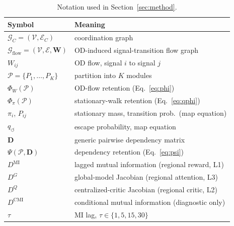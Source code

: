 \documentclass[journal]{IEEEtran}
\theoremstyle{definition}
\begin{document}
\begin{table}[t]
    \centering
    \caption{Notation used in Section~\ref{sec:method}.}
    \label{tab:notation}
    \footnotesize
    \begin{tabular}{ll}
        \toprule
        Symbol                                                             & Meaning                                           \\
        \midrule
        $\mathcal{G}_C=(\mathcal{V},\mathcal{E}_C)$                        & coordination graph                                \\
        $\mathcal{G}_{\mathrm{flow}}=(\mathcal{V},\mathcal{E},\mathbf{W})$ & OD-induced signal-transition flow graph           \\
        $W_{ij}$                                                           & OD flow, signal $i$ to signal $j$                 \\
        $\mathcal{P}=\{P_1,\ldots,P_K\}$                                   & partition into $K$ modules                        \\
        $\Phi_W(\mathcal{P})$                                              & OD-flow retention (Eq.~\eqref{eq:phi})            \\
        $\Phi_\pi(\mathcal{P})$                                            & stationary-walk retention (Eq.~\eqref{eq:qphi})   \\
        $\pi_i$, $P_{ij}$                                                  & stationary mass, transition prob.\ (map equation) \\
        $q_{\circlearrowleft}$                                             & escape probability, map equation                  \\
        $\mathbf{D}$                                                       & generic pairwise dependency matrix                \\
        $\Psi(\mathcal{P},\mathbf{D})$                                     & dependency retention (Eq.~\eqref{eq:psi})         \\
        $D^{\mathrm{MI}}$                                                  & lagged mutual information (regional reward, L1)   \\
        $D^{G}$                                                            & global-model Jacobian (regional attention, L3)    \\
        $D^{Q}$                                                            & centralized-critic Jacobian (regional critic, L2) \\
        $D^{\mathrm{CMI}}$                                                 & conditional mutual information (diagnostic only)  \\
        $\tau$                                                             & MI lag, $\tau\in\{1,5,15,30\}$                    \\
        \bottomrule
    \end{tabular}
\end{table}
\end{document}
